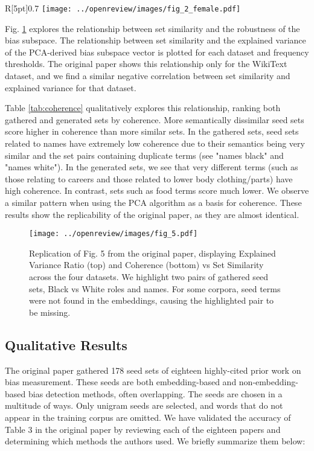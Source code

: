 \begin{wrapfigure}{R}[5pt]{0.7\textwidth}
	\centering
	\texttt{[image: ../openreview/images/fig\_2\_female.pdf]}
	\caption{\label{fig:repro_2}Reproduction of Fig. 2. Displaying the cosine similarity between the averaged vector of \textit{unpleasantness} across all 20 bootstrapped models and different seeds sets of the category \textit{female}.}
\end{wrapfigure}

Fig. \ref{fig:repro_5} explores the relationship between set similarity and the robustness of the
bias subspace. The relationship between set similarity and the explained variance of the PCA-derived
bias subspace vector is plotted for each dataset and frequency thresholds. The original paper shows
this relationship only for the WikiText dataset, and we find a similar negative correlation between
set similarity and explained variance for that dataset.

Table \ref{tab:coherence} qualitatively explores this relationship, ranking both gathered and
generated sets by coherence. More semantically dissimilar seed sets score higher in coherence than
more similar sets. In the gathered sets, seed sets related to names have extremely low coherence due
to their semantics being very similar and the set pairs containing duplicate terms (see "names
black" and "names white"). In the generated sets, we see that very different terms (such as those
relating to careers and those related to lower body clothing/parts) have high coherence. In
contrast, sets such as food terms score much lower. We observe a similar pattern when using the PCA
algorithm as a basis for coherence. These results show the replicability of the original paper, as
they are almost identical.

\begin{figure}[ht]
	\centering
	\texttt{[image: ../openreview/images/fig\_5.pdf]}
	\caption{\label{fig:repro_5}Replication of Fig. 5 from the original paper, displaying Explained Variance Ratio (top) and Coherence (bottom) vs Set Similarity across the four datasets. We highlight two pairs of gathered seed sets, Black vs White roles and names. For some corpora, seed terms were not found in the embeddings, causing the highlighted pair to be missing.}
\end{figure}

\subsection{Qualitative Results} The original paper gathered 178 seed sets of eighteen highly-cited
prior work on bias measurement. These seeds are both embedding-based and non-embedding-based bias
detection methods, often overlapping. The seeds are chosen in a multitude of ways. Only unigram
seeds are selected, and words that do not appear in the training corpus are omitted. We have
validated the accuracy of Table 3 in the original paper by reviewing each of the eighteen papers and
determining which methods the authors used. We briefly summarize them below:

